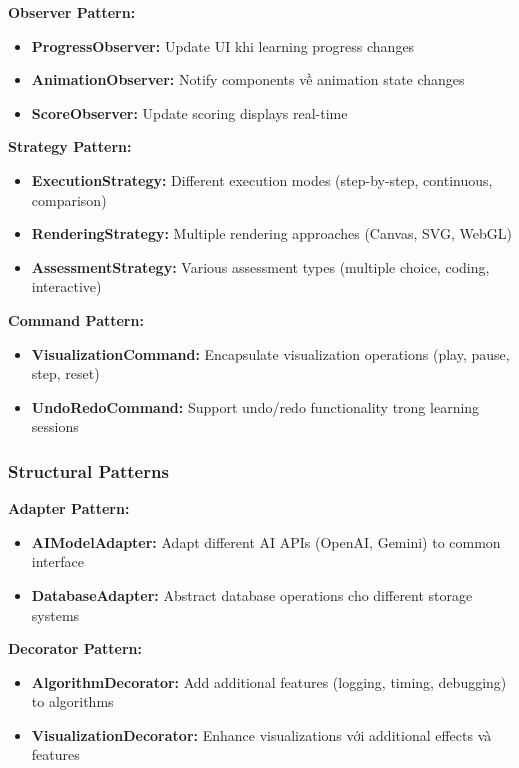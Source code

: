 \textbf{Observer Pattern:}
\begin{itemize}
    \item \textbf{ProgressObserver:} Update UI khi learning progress changes
    \item \textbf{AnimationObserver:} Notify components về animation state changes
    \item \textbf{ScoreObserver:} Update scoring displays real-time
\end{itemize}

\textbf{Strategy Pattern:}
\begin{itemize}
    \item \textbf{ExecutionStrategy:} Different execution modes (step-by-step, continuous, comparison)
    \item \textbf{RenderingStrategy:} Multiple rendering approaches (Canvas, SVG, WebGL)
    \item \textbf{AssessmentStrategy:} Various assessment types (multiple choice, coding, interactive)
\end{itemize}

\textbf{Command Pattern:}
\begin{itemize}
    \item \textbf{VisualizationCommand:} Encapsulate visualization operations (play, pause, step, reset)
    \item \textbf{UndoRedoCommand:} Support undo/redo functionality trong learning sessions
\end{itemize}

\subsubsection{Structural Patterns}

\textbf{Adapter Pattern:}
\begin{itemize}
    \item \textbf{AIModelAdapter:} Adapt different AI APIs (OpenAI, Gemini) to common interface
    \item \textbf{DatabaseAdapter:} Abstract database operations cho different storage systems
\end{itemize}

\textbf{Decorator Pattern:}
\begin{itemize}
    \item \textbf{AlgorithmDecorator:} Add additional features (logging, timing, debugging) to algorithms
    \item \textbf{VisualizationDecorator:} Enhance visualizations với additional effects và features
\end{itemize}

